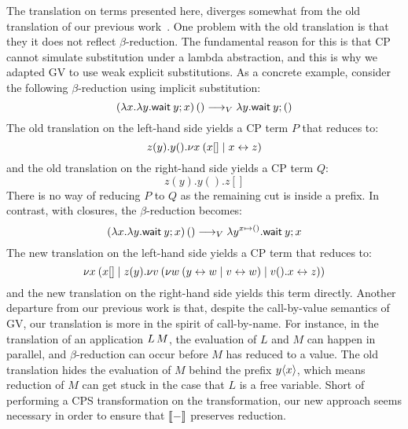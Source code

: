 \documentclass[oribibl,orivec,envcountsame]{llncs}
\begin{document}
The translation on terms presented here, diverges somewhat from the old translation of our previous
work~\cite{Wadler14,LindleyM14}. One problem with the old translation is that they it does not reflect
$\beta$-reduction. The fundamental reason for this is that CP cannot simulate substitution under a
lambda abstraction, and this is why we adapted GV to use weak explicit substitutions.
%
As a concrete example, consider the following $\beta$-reduction using implicit substitution:
\[
(\lambda x.\lambda y.\mathsf{wait}\:y; x) \, () \longrightarrow_V \lambda y.\mathsf{wait}\:y; ()
\]
The old translation on the left-hand side yields a CP term $P$ that reduces to:
\[
z(y).y().\nu x \: (x[] \mid x \leftrightarrow z)
\]
and the old translation on the right-hand side yields a CP term $Q$:
\[
z(y).y().z[]
\]
There is no way of reducing $P$ to $Q$ as the remaining cut is inside a prefix.
%
In contrast, with closures, the $\beta$-reduction becomes:
\[
(\lambda x.\lambda y.\mathsf{wait}\:y; x) \, () \longrightarrow_V \lambda y^{x \mapsto ()}.\mathsf{wait}\:y; x
\]
The new translation on the left-hand side yields a CP term that reduces to:
\[
\nu x \: (x[] \mid z(y).\nu v \: (\nu w \: (y \leftrightarrow w \mid v \leftrightarrow w) \mid v().x \leftrightarrow z))
\]
and the new translation on the right-hand side yields this term directly.
%
Another departure from our previous work is that, despite the call-by-value semantics of GV, our
translation is more in the spirit of call-by-name. For instance, in the translation of an
application $L \, M$, the evaluation of $L$ and $M$ can happen in parallel, and $\beta$-reduction
can occur before $M$ has reduced to a value. The old translation hides the evaluation of $M$ behind
the prefix $y\langle x\rangle$, which means reduction of $M$ can get stuck in the case that $L$ is a free
variable.
%
Short of performing a CPS transformation on the transformation, our new approach seems necessary in
order to ensure that $\llbracket - \rrbracket$ preserves reduction.
\end{document}
